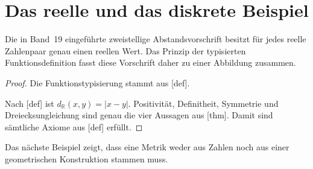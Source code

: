 \documentclass[main.tex]{subfiles}
\begin{document}
\section{Das reelle und das diskrete Beispiel}

Die in Band~19 eingeführte zweistellige Abstandsvorschrift besitzt für jedes
reelle Zahlenpaar genau einen reellen Wert. Das Prinzip der typisierten
Funktionsdefinition fasst diese Vorschrift daher zu einer Abbildung zusammen.


\begin{proof}
Die Funktionstypisierung stammt aus
[def].

Nach
[def] ist
\(d_{\mathbb R}(x,y)=|x-y|\). Positivität, Definitheit, Symmetrie und
Dreiecksungleichung sind genau die vier Aussagen aus
[thm]. Damit sind sämtliche Axiome aus
[def] erfüllt.
\end{proof}

Das nächste Beispiel zeigt, dass eine Metrik weder aus Zahlen noch aus einer
geometrischen Konstruktion stammen muss.

\end{document}
